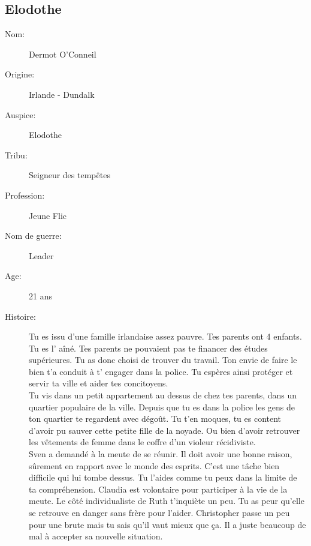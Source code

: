 \documentclass[oneside,12pt]{book}
\begin{document}
\begin{flushleft}
\section{Elodothe}
\begin{description}
\item[Nom:]{Dermot O'Conneil}
\item[Origine:]{Irlande - Dundalk}
\item[Auspice:]{Elodothe}
\item[Tribu:]{Seigneur des tempêtes}
\item[Profession:]{Jeune Flic}
\item[Nom de guerre:]{Leader}
\item[Age:]{21 ans}
\item[Histoire:]{
Tu es issu d'une famille irlandaise assez pauvre. Tes parents ont 4 enfants. Tu es l' aîné. Tes parents ne pouvaient pas te financer des études supérieures. Tu as donc choisi de trouver du travail. Ton envie de faire le bien t'a conduit à t' engager dans la police. 
Tu espères ainsi protéger et servir ta ville et aider tes concitoyens.\\
Tu vis dans un petit appartement au dessus de chez tes parents, dans un quartier populaire de la ville. Depuis que tu es dans la police les gens de ton quartier te regardent avec dégoût. Tu t'en moques, tu es content d'avoir pu sauver cette petite fille de la noyade. Ou bien d'avoir retrouver les vêtements de femme dans le coffre d'un violeur récidiviste. \\
Sven a demandé à la meute de se réunir. Il doit avoir une bonne raison, sûrement en rapport avec le monde des esprits. C'est une tâche bien difficile qui lui tombe dessus. Tu l'aides comme tu peux dans la limite de ta compréhension. Claudia est volontaire pour participer à la vie de la meute. Le côté individualiste de Ruth t'inquiète un peu. Tu as peur qu'elle se retrouve en danger sans frère pour l'aider. Christopher passe un peu pour une brute mais tu sais qu'il vaut mieux que ça. Il a juste beaucoup de mal à accepter sa nouvelle situation. \\

}
\end{description}
\end{flushleft}
\end{document}
